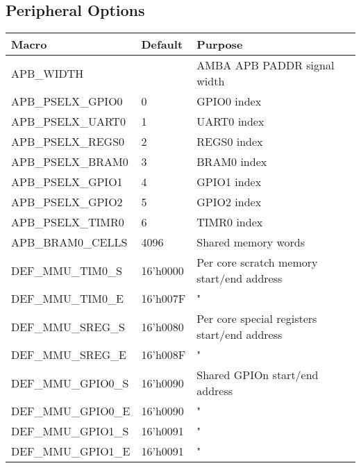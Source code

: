 \begin{appendices}
\section{Peripheral Options}
\begin{table}[H]
\centering
\begin{tabular}{l|l|l}
Macro              & Default  & Purpose                                              \\ 
\hline
APB\_WIDTH         &          & AMBA APB PADDR signal width                          \\
APB\_PSELX\_GPIO0  & 0        & GPIO0 index                                          \\
APB\_PSELX\_UART0  & 1        & UART0 index                                          \\
APB\_PSELX\_REGS0  & 2        & REGS0 index                                          \\
APB\_PSELX\_BRAM0  & 3        & BRAM0 index                                          \\
APB\_PSELX\_GPIO1  & 4        & GPIO1 index                                          \\
APB\_PSELX\_GPIO2  & 5        & GPIO2 index                                          \\
APB\_PSELX\_TIMR0  & 6        & TIMR0 index                                          \\
APB\_BRAM0\_CELLS  & 4096     & Shared memory words                                  \\
DEF\_MMU\_TIM0\_S  & 16'h0000 & Per core scratch memory start/end address            \\
DEF\_MMU\_TIM0\_E  & 16'h007F & "                                                    \\
DEF\_MMU\_SREG\_S  & 16'h0080 & Per core special registers start/end address         \\
DEF\_MMU\_SREG\_E  & 16'h008F & "                                                    \\
DEF\_MMU\_GPIO0\_S & 16'h0090 & Shared GPIOn start/end address                       \\
DEF\_MMU\_GPIO0\_E & 16'h0090 & "                                                    \\
DEF\_MMU\_GPIO1\_S & 16'h0091 & "                                                    \\
DEF\_MMU\_GPIO1\_E & 16'h0091 & "                                                    \\

\end{tabular}
\end{table}
\end{appendices}
